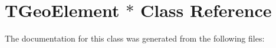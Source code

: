 \hypertarget{class_t_geo_element_01_5}{}\section{T\+Geo\+Element $\ast$ Class Reference}
\label{class_t_geo_element_01_5}


The documentation for this class was generated from the following files\+: